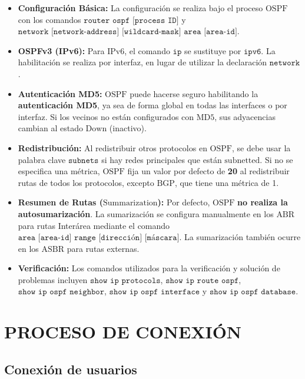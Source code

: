 \documentclass[a5paper]{book}%
\begin{document}
  \begin{itemize}
  	\item \textbf{Configuración Básica:} La configuración se realiza bajo el proceso $\text{OSPF}$ con los comandos $\texttt{router ospf [process ID]}$ y $\texttt{network [network-address] [wildcard-mask] area [area-id]}$.
  	\item \textbf{OSPFv3 (IPv6):} Para $\text{IPv6}$, el comando $\texttt{ip}$ se sustituye por $\texttt{ipv6}$. La habilitación se realiza por interfaz, en lugar de utilizar la declaración $\texttt{network}$.
  	\item \textbf{Autenticación MD5:} $\text{OSPF}$ puede hacerse seguro habilitando la \textbf{autenticación MD5}, ya sea de forma global en todas las interfaces o por interfaz. Si los vecinos no están configurados con $\text{MD5}$, sus adyacencias cambian al estado $\text{Down}$ (inactivo).
  	\item \textbf{Redistribución:} Al redistribuir otros protocolos en $\text{OSPF}$, se debe usar la palabra clave $\texttt{subnets}$ si hay redes principales que están $\text{subnetted}$. Si no se especifica una métrica, $\text{OSPF}$ fija un valor por defecto de \textbf{20} al redistribuir rutas de todos los protocolos, excepto $\text{BGP}$, que tiene una métrica de 1.
  	\item \textbf{Resumen de Rutas ($\text{Summarization}$):} Por defecto, $\text{OSPF}$ \textbf{no realiza la autosumarización}. La sumarización se configura manualmente en los $\text{ABR}$ para rutas Interárea mediante el comando $\texttt{area [area-id] range [dirección] [máscara]}$. La sumarización también ocurre en los $\text{ASBR}$ para rutas externas.
  	\item \textbf{Verificación:} Los comandos utilizados para la verificación y solución de problemas incluyen $\texttt{show ip protocols}$, $\texttt{show ip route ospf}$, $\texttt{show ip ospf neighbor}$, $\texttt{show ip ospf interface}$ y $\texttt{show ip ospf database}$.
  \end{itemize}
  
  
  
\chapter{PROCESO DE CONEXIÓN}



\section{Conexión de usuarios}
\end{document}

